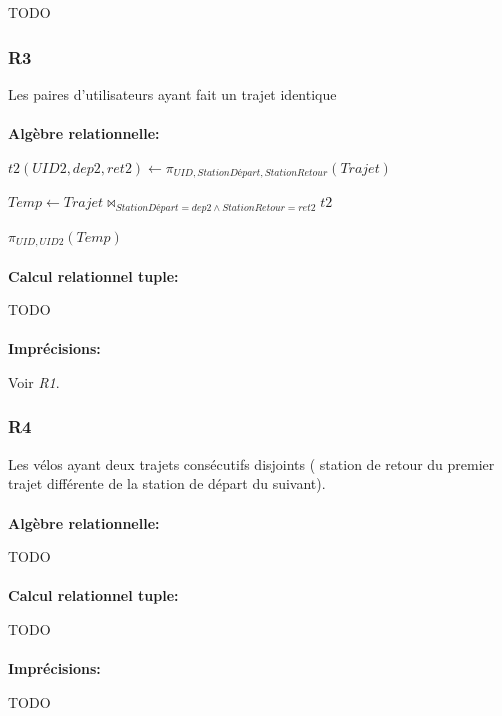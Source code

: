 \documentclass[a4paper, 12pt]{report}
\begin{document}
TODO%

\subsubsection*{R3}

Les paires d'utilisateurs ayant fait un trajet identique
\paragraph{}
\textbf{Algèbre relationnelle:}

$t2(UID2,dep2,ret2)\leftarrow\pi_{UID,StationDépart,StationRetour}(Trajet)$

$Temp\leftarrow Trajet\bowtie_{StationDépart=dep2\wedge StationRetour=ret2}t2$

$\pi_{UID,UID2}(Temp)$

\paragraph{}
\textbf{Calcul relationnel tuple:}

TODO %

\paragraph{}
\textbf{Imprécisions:}

Voir \textit{R1}.

\subsubsection*{R4}

Les vélos ayant deux trajets consécutifs disjoints ( station de retour du premier trajet différente de la station de départ du suivant).
\paragraph{}
\textbf{Algèbre relationnelle:}

TODO %

\paragraph{}
\textbf{Calcul relationnel tuple:}

TODO %

\paragraph{}
\textbf{Imprécisions:}

TODO%
\end{document}
